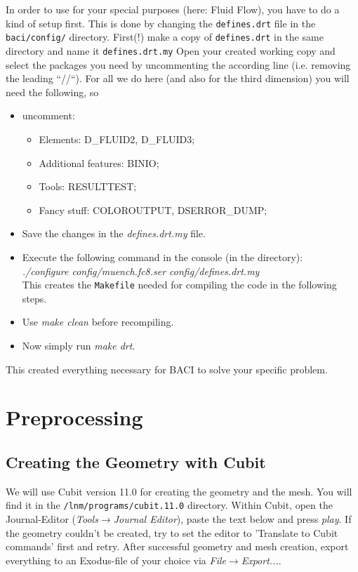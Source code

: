 In order to use \baci{} for your special purposes (here: Fluid Flow), you have
to do a kind of setup first. This is done by changing the \texttt{defines.drt}
file in the \texttt{baci/config/} directory. 
First(!) make a copy of \texttt{defines.drt} in the same directory and name it \texttt{defines.drt.my}
Open your created working copy and select the
packages you need by uncommenting the according line (i.e. removing the leading ``//``). For all we do
here (and also for the third dimension) you will need the following,
so
\begin{itemize}
\item uncomment:
\begin{itemize}
\item Elements: D\_FLUID2, D\_FLUID3;
\item Additional features: BINIO;
\item Tools: RESULTTEST;
\item Fancy stuff: COLOROUTPUT, DSERROR\_DUMP;
\end{itemize}
\item Save the changes in the \emph{defines.drt.my} file. 
\item Execute the following command in the console (in the \baci{} directory):\\
\emph{./configure config/muench.fc8.ser config/defines.drt.my}\\
This creates the \texttt{Makefile} needed for compiling the code
in the following steps. 
\item Use \emph{make clean} before recompiling. 
\item Now simply run \emph{make drt}.
\end{itemize}
This created everything necessary for BACI to solve your specific
problem.


\section{Preprocessing}

\subsection{Creating the Geometry with Cubit}
We will use Cubit version 11.0 for creating the geometry and the mesh. You will find it in the \newline
\texttt{/lnm/programs/cubit.11.0} directory. Within Cubit, open the Journal-Editor (\emph{Tools}$\to$\emph{Journal
Editor}), paste the text below and press \emph{play}. If the geometry couldn't be created, try to set the editor to 
'Translate to Cubit commands' first and retry. After successful geometry and mesh creation, export everything to an Exodus-file of your choice via \emph{File}$\to$\emph{Export...}.

